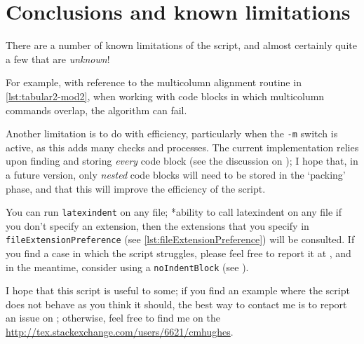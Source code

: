 \section{Conclusions and known limitations}\label{sec:knownlimitations}
 There are a number of known limitations of the script, and almost certainly quite a few
 that are \emph{unknown}!

 For example, with reference to the multicolumn alignment routine in
 \vref{lst:tabular2-mod2}, when working with code blocks in which multicolumn commands
 overlap, the algorithm can fail.

 Another limitation is to do with efficiency, particularly when the \texttt{-m} switch is
 active, as this adds many checks and processes. The current implementation relies upon
 finding and storing \emph{every} code block (see the discussion on
 ); I hope that, in a future version, only \emph{nested} code blocks
 will need to be stored in the `packing' phase, and that this will improve the efficiency
 of the script.

 You can run \texttt{latexindent} on any file; *{ability to call
 latexindent on any file} if you don't specify an extension, then the extensions that you
 specify in \lstinline[breaklines=true]!fileExtensionPreference! (see
 \vref{lst:fileExtensionPreference}) will be consulted. If you find a case in which the
 script struggles, please feel free to report it at \cite{latexindent-home}, and in the
 meantime, consider using a \texttt{noIndentBlock} (see ).%

 I hope that this script is useful to some; if you find an example where the script does
 not behave as you think it should, the best way to contact me is to report an issue on
 \cite{latexindent-home}; otherwise, feel free to find me on the
 \url{http://tex.stackexchange.com/users/6621/cmhughes}.
